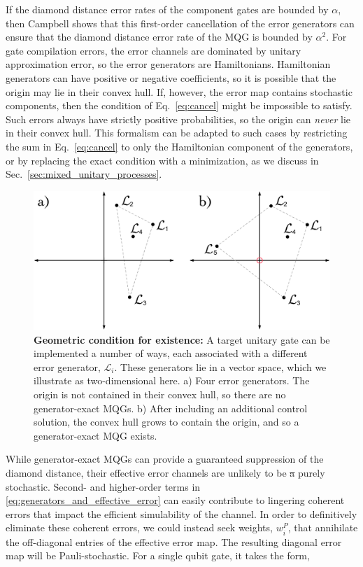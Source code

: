 \documentclass[aps,nofootinbib,pra,notitlepage,twocolumn]{revtex4-1}
\newcommand{\genmat}{\ensuremath{{\mathcal{L}}}}
\newcommand{\0}{\ensuremath{\mathbf{0}}}
\newcommand{\weight}{\ensuremath{w}}
\providecommand{\DIFdeltex}[1]{{\protect\color{red}\sout{#1}}}                      %
\providecommand{\DIFdelbegin}{} %
\providecommand{\DIFdelend}{} %
\providecommand{\DIFdel}[1]{\texorpdfstring{\DIFdeltex{#1}}{}} %
\newcommand{\DIFscaledelfig}{0.5}
\newlength{\DIFdelgraphicswidth} %
\newlength{\DIFdelgraphicsheight} %
\newcommand{\DIFdelincludegraphics}[2][]{%
\sbox{\DIFdelgraphicsbox}{\DIFOincludegraphics[#1]{#2}}%
\settoboxwidth{\DIFdelgraphicswidth}{\DIFdelgraphicsbox} %
\settoboxtotalheight{\DIFdelgraphicsheight}{\DIFdelgraphicsbox} %
\scalebox{\DIFscaledelfig}{%
\parbox[b]{\DIFdelgraphicswidth}{\usebox{\DIFdelgraphicsbox}\\[-\baselineskip] \rule{\DIFdelgraphicswidth}{0em}}\llap{\resizebox{\DIFdelgraphicswidth}{\DIFdelgraphicsheight}{%
\setlength{\unitlength}{\DIFdelgraphicswidth}%
\begin{picture}(1,1)%
\thicklines\linethickness{2pt} %
{\color[rgb]{1,0,0}\put(0,0){\framebox(1,1){}}}%
{\color[rgb]{1,0,0}\put(0,0){\line( 1,1){1}}}%
{\color[rgb]{1,0,0}\put(0,1){\line(1,-1){1}}}%
\end{picture}%
}\hspace*{3pt}}} %
} %
\DeclareRobustCommand{\DIFdelbegin}{\DIFOdelbegin \let\includegraphics\DIFdelincludegraphics} %
\DeclareRobustCommand{\DIFdelend}{\DIFOaddend \let\includegraphics\DIFOincludegraphics} %
\begin{document}
If the diamond distance error rates of the component gates are bounded by $\alpha$, then Campbell shows that this first-order cancellation of the error generators can ensure that the diamond distance error rate of the MQG is bounded by $\alpha^2$. For gate compilation errors, the error channels are dominated by unitary approximation error, so the error generators are Hamiltonians. Hamiltonian generators can have positive or negative coefficients, so it is possible that the origin may lie in their convex hull. If, however, the error map contains stochastic components, then the condition of Eq.~\eqref{eq:cancel} might be impossible to satisfy. Such errors always have strictly positive probabilities, so the origin can \emph{never} lie in their convex hull. This formalism can be adapted to such cases by restricting the sum in Eq.~\eqref{eq:cancel} to only the Hamiltonian component of the generators, or by replacing the exact condition with a minimization, as we discuss in Sec.~\ref{sec:mixed_unitary_processes}. 

\begin{figure}
  \centering
  \includegraphics[width=\columnwidth]{vectorspace.pdf}
  \caption{\textbf{Geometric condition for existence:} A target unitary gate can be implemented a number of ways, each associated with a different error generator, $\genmat_i$. These generators lie in a vector space, which we illustrate as two-dimensional here. a) Four error generators. The origin is not contained in their convex hull, so there are no generator-exact MQGs. b) After including an additional control solution, the convex hull grows to contain the origin, and so a generator-exact MQG exists. }
  \label{fig:vectorspace}
\end{figure}

While generator-exact MQGs can provide a guaranteed suppression of the diamond distance, their effective error channels are unlikely to be \DIFdelbegin \DIFdel{a }\DIFdelend purely stochastic. Second- and higher-order terms in \eqref{eq:generators_and_effective_error} can easily contribute to lingering coherent errors that impact the efficient simulability of the channel. In order to definitively eliminate these coherent errors, we could instead seek weights, $\weight^P_i$, that annihilate the off-diagonal entries of the effective error map. The resulting diagonal error map will be Pauli-stochastic. For a single qubit gate, it takes the form,
\end{document}
